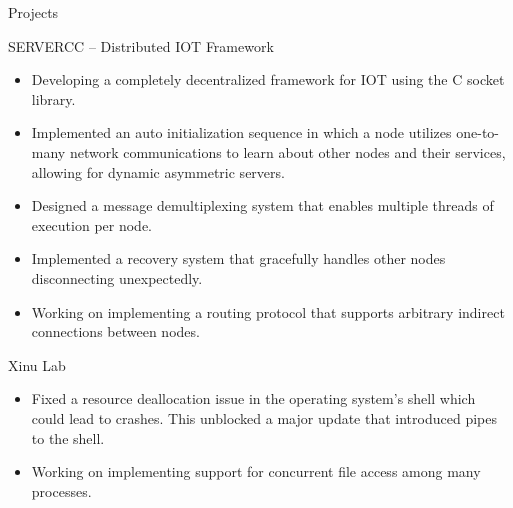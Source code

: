 \documentclass[]{article}
\newlength{\tabin}
\newlength{\secsep}
\newcommand{\lineunder}{\vspace*{-8pt} \\ \hspace*{-6pt} \hrulefill \\ \vspace*{-15pt}}
\newenvironment{tabbedsection}[1]{
  \begin{list}{}{
      \setlength{\itemsep}{0pt}
      \setlength{\labelsep}{0pt}
      \setlength{\labelwidth}{0pt}
      \setlength{\leftmargin}{\tabin}
      \setlength{\rightmargin}{\tabin}
      \setlength{\listparindent}{0pt}
      \setlength{\parsep}{0pt}
      \setlength{\parskip}{0pt}
      \setlength{\partopsep}{0pt}
      \setlength{\topsep}{#1}
    }
  \item[]
}{\end{list}}
\newenvironment{resume_section}[1]{
  \filbreak
  \vspace{2\secsep}
  \textsc{\large#1}
  \lineunder
  \begin{tabbedsection}{\secsep}
}{\end{tabbedsection}}
\newenvironment{resume_subsection}[2][]{
  \textbf{#2} \hfill {\footnotesize #1} \hspace{2em}
  \begin{tabbedsection}{0.5\secsep}
}{\end{tabbedsection}}
\newenvironment{subitems}{
  \renewcommand{\labelitemi}{-}
  \begin{itemize}
      \setlength{\labelsep}{1em}
}{\end{itemize}}
\begin{document}

\begin{resume_section}{Projects}

	\begin{resume_subsection}{SERVERCC -- Distributed IOT Framework}

		\begin{subitems}

			\item Developing a completely decentralized framework for IOT using the C socket library.

			\item Implemented an auto initialization sequence in which a node utilizes one-to-many
			network communications to learn about other nodes and their services, 
			allowing for dynamic asymmetric servers.

			\item Designed a message demultiplexing system that enables multiple threads of
			execution per node.

			\item Implemented a recovery system that gracefully handles other nodes disconnecting
			unexpectedly.

			\item Working on implementing a routing protocol that supports arbitrary indirect
			connections between nodes.

		\end{subitems}

	\end{resume_subsection}

	\begin{resume_subsection}{Xinu Lab}

		\begin{subitems}

			\item Fixed a resource deallocation issue in the operating system's shell which could
			lead to crashes. This unblocked a major update that introduced pipes to the shell.

			\item Working on implementing support for concurrent file access among many processes.

		\end{subitems}

	\end{resume_subsection}

\end{resume_section}
\end{document}
